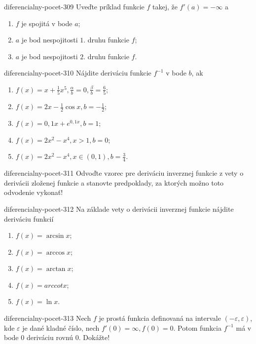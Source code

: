 \begin{defproblem}{diferencialny-pocet-309}
Uveďte príklad funkcie $f$ takej, že $f'(a)=-\infty$ a
\begin{enumerate}
\item $f$ je spojitá v bode $a$;
\item $a$ je bod nespojitosti $1.$ druhu funkcie $f$;
\item $a$ je bod nespojitosti $2.$ druhu funkcie $f$.
\end{enumerate}
\end{defproblem}

\begin{defproblem}{diferencialny-pocet-310}
Nájdite deriváciu funkcie $f^{-1}$ v bode $b$, ak
\begin{enumerate}
\item $f(x)=x+\frac{1}{5}x^5,\frac{\alpha}{b}=0,\frac{\beta}{b}=\frac{6}{5}$;
\item $f(x)=2x-\frac{1}{2}\cos x,b=-\frac{1}{2}$;
\item $f(x)=0,1x+e^{0,1x},b=1$;
\item $f(x)=2x^2-x^4,x>1,b=0$;
\item $f(x)=2x^2-x^4,x\in (0,1),b=\frac{3}{4}$.
\end{enumerate}
\end{defproblem}

\begin{defproblem}{diferencialny-pocet-311}
Odvoďte vzorec pre deriváciu inverznej funkcie z vety o derivácii zloženej funkcie a stanovte predpoklady, za ktorých možno toto odvodenie vykonať!
\end{defproblem}

\begin{defproblem}{diferencialny-pocet-312}
Na základe vety o derivácii inverznej funkcie nájdite deriváciu funkcií
\begin{multicols}{2}
\begin{enumerate}
    \item $f(x)=\arcsin x$;
    \item $f(x)=\arccos x$;
    \item $f(x)=\arctan x$;
    \item $f(x)=arccot x$;
    \item $f(x)=\ln x$.
\end{enumerate}
\end{multicols}
\end{defproblem}

\begin{defproblem}{diferencialny-pocet-313}
Nech $f$ je prostá funkcia definovaná na intervale $(-\varepsilon,\varepsilon)$, kde $\varepsilon$ je dané kladné číslo, nech $f'(0)=\infty,f(0)=0$. Potom funkcia $f^{-1}$ má v bode $0$ deriváciu rovnú $0$. Dokážte!
\end{defproblem}

